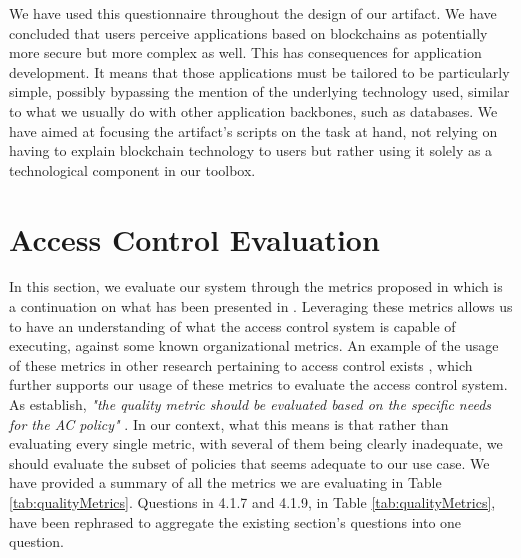 We have used this questionnaire throughout the design of our artifact. We have concluded that users perceive applications based on blockchains as potentially more secure but more complex as well. This has consequences for application development. It means that those applications must be tailored to be particularly simple, possibly bypassing the mention of the underlying technology used, similar to what we usually do with other application backbones, such as databases. We have aimed at focusing the artifact's scripts on the task at hand, not relying on having to explain blockchain technology to users but rather using it solely as a technological component in our toolbox.

\section{Access Control Evaluation}

In this section, we evaluate our system through the metrics proposed in \cite{hu_guidelines_2012} which is a continuation on what has been presented in \cite{hu_assessment_2006}. Leveraging these metrics allows us to have an understanding of what the access control system is capable of executing, against some known organizational metrics. An example of the usage of these metrics in other research pertaining to access control exists \cite{LE2014184}, which further supports our usage of these metrics to evaluate the access control system. As \citeauthor{hu_guidelines_2012} \cite{hu_guidelines_2012} establish, \emph{"the quality metric should be evaluated based on the specific needs for the AC policy"} \cite[25]{hu_guidelines_2012}. In our context, what this means is that rather than evaluating every single metric, with several of them being clearly inadequate, we should evaluate the subset of policies that seems adequate to our use case. We have provided a summary of all the metrics we are evaluating in Table \ref{tab:qualityMetrics}. Questions in 4.1.7 and 4.1.9, in Table \ref{tab:qualityMetrics}, have been rephrased to aggregate the existing section's questions into one question. 

